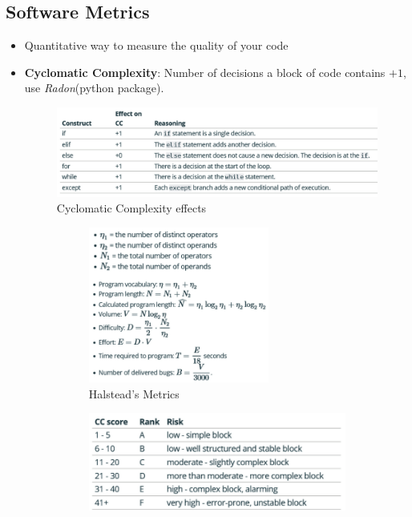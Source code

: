 \documentclass[a4paper]{article}
\begin{document}
\subsection{Software Metrics}
\begin{itemize}
    \item Quantitative way to measure the quality of your code
    \item \textbf{Cyclomatic Complexity}: Number of decisions a block of code contains $+ 1$, use \textit{Radon}(python package).
    \begin{figure}[H]
        \centering
        \includegraphics[width=\linewidth]{Degree//static/SE_Cyclomatic_complexity.png}
        \caption{Cyclomatic Complexity effects}
    \end{figure}
    \begin{figure}[H]
        \centering
        \begin{subfigure}[b]{0.45\linewidth}
            \centering
            \includegraphics[width=0.7\textwidth]{Degree//static/SE_Halstead_metrics.png}
            \caption{Halstead's Metrics}
        \end{subfigure}
        \hfill
        \begin{subfigure}[b]{0.45\linewidth}
            \centering
            \includegraphics[width=\linewidth]{Degree/static/SE_CC_score.png}

\end{subfigure}
\end{figure}
\end{itemize}
\end{document}
